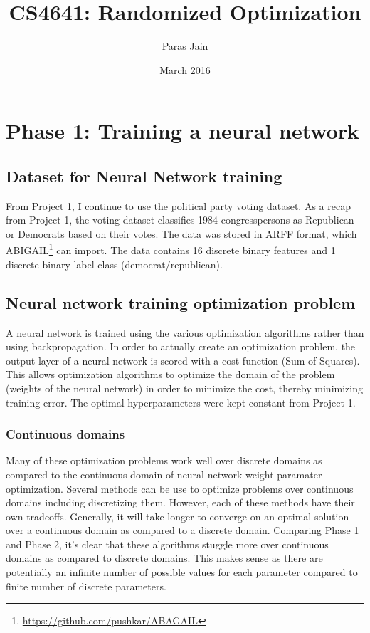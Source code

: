 \documentclass[12pt]{article}
\title{CS4641: Randomized Optimization}
\author{Paras Jain}
\date{March 2016}
\begin{document}
\maketitle




\section{Phase 1: Training a neural network}
\subsection{Dataset for Neural Network training}
From Project 1, I continue to use the political party voting dataset. As a recap from Project 1, the voting dataset classifies 1984 congresspersons as Republican or Democrats based on their votes. The data was stored in ARFF format, which ABIGAIL\footnote{\url{https://github.com/pushkar/ABAGAIL}} can import. The data contains 16 discrete binary features and 1 discrete binary label class (democrat/republican).

\subsection{Neural network training optimization problem}
A neural network is trained using the various optimization algorithms rather than using backpropagation. In order to actually create an optimization problem, the output layer of a neural network is scored with a cost function (Sum of Squares). This allows optimization algorithms to optimize the domain of the problem (weights of the neural network) in order to minimize the cost, thereby minimizing training error. The optimal hyperparameters were kept constant from Project 1.

\subsubsection{Continuous domains}
Many of these optimization problems work well over discrete domains as compared to the continuous domain of neural network weight paramater optimization. Several methods can be use to optimize problems over continuous domains including discretizing them. However, each of these methods have their own tradeoffs.
Generally, it will take longer to converge on an optimal solution over a continuous domain as compared to a discrete domain. Comparing Phase 1 and Phase 2, it's clear that these algorithms stuggle more over continuous domains as compared to discrete domains. This makes sense as there are potentially an infinite number of possible values for each parameter compared to finite number of discrete parameters.
\end{document}
